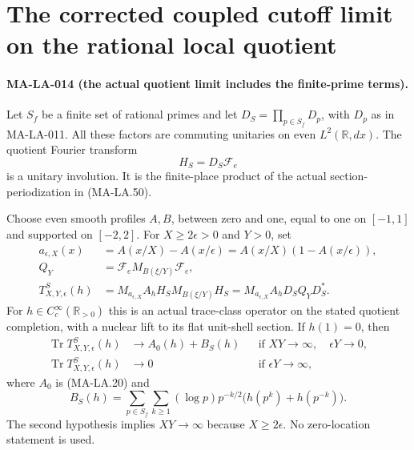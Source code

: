\section{The corrected coupled cutoff limit on the rational local quotient}
\label{sec:local-quotient-limit}

\paragraph{MA-LA-014 (the actual quotient limit includes the finite-prime terms).}
Let $S_f$ be a finite set of rational primes and let
$D_S=\prod_{p\in S_f}D_p$, with $D_p$ as in MA-LA-011.
All these factors are commuting unitaries on even
$L^2(\mathbb R,dx)$.  The quotient Fourier transform
\[
                      H_S=D_S\mathcal F_e
 \tag{MA-LA.67}
\]
is a unitary involution.  It is the finite-place product
of the actual section-periodization in (MA-LA.50).

Choose even smooth profiles $A,B$, between zero and one,
equal to one on $[-1,1]$ and supported on $[-2,2]$.
For $X\ge2\epsilon>0$ and $Y>0$, set
\[
 \begin{aligned}
 a_{\epsilon,X}(x)
    &=A(x/X)-A(x/\epsilon)
      =A(x/X)(1-A(x/\epsilon)),\\
 Q_Y&=\mathcal F_e M_{B(\xi/Y)}\mathcal F_e,\\
 T^S_{X,Y,\epsilon}(h)
    &=M_{a_{\epsilon,X}}A_hH_SM_{B(\xi/Y)}H_S
      =M_{a_{\epsilon,X}}A_hD_SQ_YD_S^* .
 \end{aligned}
 \tag{MA-LA.68}
\]
For $h\in C_c^\infty(\mathbb R_{>0})$ this is an actual
trace-class operator on the stated quotient completion,
with a nuclear lift to its flat unit-shell section.
If $h(1)=0$, then
\[
 \begin{aligned}
 \operatorname{Tr}T^S_{X,Y,\epsilon}(h)
       &\longrightarrow A_0(h)+B_S(h)
           &&\text{if }XY\to\infty,\quad\epsilon Y\to0,\\
 \operatorname{Tr}T^S_{X,Y,\epsilon}(h)
       &\longrightarrow0
           &&\text{if }\epsilon Y\to\infty,
 \end{aligned}
 \tag{MA-LA.69}
\]
where $A_0$ is (MA-LA.20) and
\[
 B_S(h)=\sum_{p\in S_f}\sum_{k\ge1}
       (\log p)p^{-k/2}\bigl(h(p^k)+h(p^{-k})\bigr).
 \tag{MA-LA.70}
\]
The second hypothesis implies $XY\to\infty$ because
$X\ge2\epsilon$.
No zero-location statement is used.

